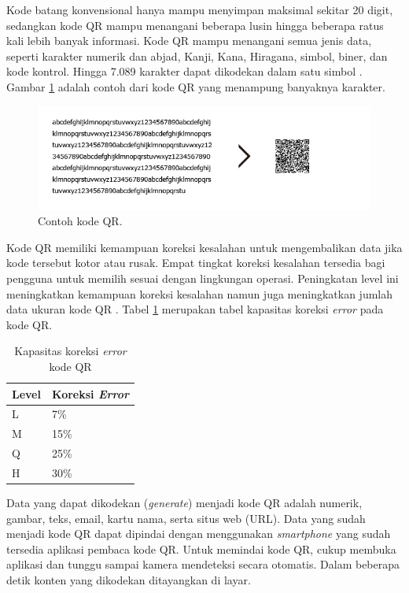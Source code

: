 Kode batang konvensional hanya mampu menyimpan maksimal sekitar 20 digit, sedangkan kode QR mampu menangani beberapa lusin hingga beberapa ratus kali lebih banyak informasi. Kode QR mampu menangani semua jenis data, seperti karakter numerik dan abjad, Kanji, Kana, Hiragana, simbol, biner, dan kode kontrol. Hingga 7.089 karakter dapat dikodekan dalam satu simbol \citep{wave2017}. Gambar \ref{qrcode} adalah contoh dari kode QR yang menampung banyaknya karakter.

\begin{figure}[H]
	\centering
	\includegraphics[width=\linewidth]{gambar/qrcode}
	\caption{Contoh kode QR.}
	\label{qrcode}
\end{figure}

Kode QR memiliki kemampuan koreksi kesalahan untuk mengembalikan data jika kode tersebut kotor atau rusak. Empat tingkat koreksi kesalahan tersedia bagi pengguna untuk memilih sesuai dengan lingkungan operasi. Peningkatan level ini meningkatkan kemampuan koreksi kesalahan namun juga meningkatkan jumlah data ukuran kode QR \citep{wave2017}. Tabel \ref{contoh1} merupakan tabel kapasitas koreksi \textit{error} pada kode QR.

\begin{table}[H]
	\centering
	\caption{Kapasitas koreksi \textit{error} kode QR}
	\label{contoh1}
	\begin{tabular}{ |l|l| }
		\hline
		Level & Koreksi \textit{Error} \\ \hline
		L & 7\% \\ \hline
		M & 15\% \\ \hline
		Q & 25\% \\ \hline
		H & 30\% \\ \hline	
	\end{tabular}
\end{table}

Data yang dapat dikodekan (\textit{generate}) menjadi kode QR adalah numerik, gambar, teks, email, kartu nama, serta situs web (URL). Data yang sudah menjadi kode QR dapat dipindai dengan menggunakan \textit{smartphone} yang sudah tersedia aplikasi pembaca kode QR. Untuk memindai kode QR, cukup membuka aplikasi dan tunggu sampai kamera mendeteksi secara otomatis. Dalam beberapa detik konten yang dikodekan ditayangkan di layar.


